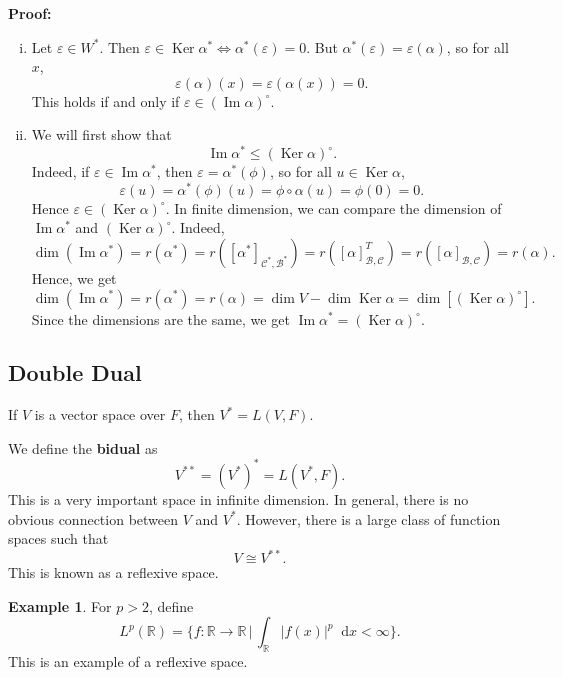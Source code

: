 \documentclass[12pt]{article}
\DeclareMathOperator{\Ker}{Ker}
\DeclareMathOperator{\Img}{Im}
\newcommand{\diff}{\mathop{}\!\mathrm{d}}
\theoremstyle{definition}
\newtheorem{example}{Example}[section]
\theoremstyle{remark}
\begin{document}
\begin{adjustbox}{minipage = \columnwidth - 25.5pt, margin=1em, frame=1pt, margin=0em}
\textbf{Proof:}
\begin{enumerate}[(i)]
	\item Let $\varepsilon \in W^{\ast}$. Then $\varepsilon \in \Ker \alpha^{\ast} \iff \alpha^{\ast} (\varepsilon) = 0$. But $\alpha^{\ast}(\varepsilon) = \varepsilon(\alpha)$, so for all $x$,
			\[
				\varepsilon(\alpha)(x) = \varepsilon(\alpha(x)) = 0
			.\]
			This holds if and only if $\varepsilon \in (\Img \alpha)^{\circ}$.
		\item We will first show that
			 \[
				 \Img \alpha^{\ast} \leq (\Ker \alpha)^{\circ}
			.\]
			Indeed, if $\varepsilon \in \Img \alpha^{\ast}$, then $\varepsilon = \alpha^{\ast}(\phi)$, so for all $u \in \Ker \alpha$,
			\[
				\varepsilon(u) = \alpha^{\ast}(\phi) (u) = \phi \circ \alpha(u) = \phi(0) = 0
			.\]
			Hence $\varepsilon \in (\Ker \alpha)^{\circ}$. In finite dimension, we can compare the dimension of $\Img \alpha^{\ast}$ and $(\Ker \alpha)^{\circ}$. Indeed,
			\[
				\dim (\Img \alpha^{\ast}) = r(\alpha^{\ast}) = r([\alpha^{\ast}]_{\mathcal{C}^{\ast}, \mathcal{B}^{\ast}}) = r([\alpha]_{\mathcal{B},\mathcal{C}}^{T}) = r([\alpha]_{\mathcal{B}, \mathcal{C}}) = r(\alpha)
			.\]
			Hence, we get
			\[
				\dim (\Img \alpha^{\ast}) = r(\alpha^{\ast}) = r(\alpha) = \dim V - \dim \Ker \alpha = \dim [(\Ker \alpha)^{\circ}]
			.\]
			Since the dimensions are the same, we get $\Img \alpha^{\ast} = (\Ker \alpha)^{\circ}$.
\end{enumerate}
\end{adjustbox}

\subsection{Double Dual}%
\label{sub:double_dual}

If $V$ is a vector space over $F$, then $V^{\ast} = L(V, F)$.

We define the \textbf{bidual} as
\[
	V^{\ast \ast} = (V^{\ast})^{\ast} = L(V^{\ast}, F)
.\]
This is a very important space in infinite dimension. In general, there is no obvious connection between $V$ and $V^{\ast}$. However, there is a large class of function spaces such that
\[
V \cong V^{\ast \ast}
.\]
This is known as a reflexive space.

\begin{adjustbox}{minipage = \columnwidth - 25.5pt, margin=1em, frame=1pt, margin=0em}
\begin{example}
	For $p > 2$, define
	\[
		L^{p}(\mathbb{R}) = \biggl\{ f : \mathbb{R} \to \mathbb{R} \,\bigg\vert\, \int_{\mathbb{R}} |f(x)|^{p} \diff x < \infty \biggr\}
	.\]
	This is an example of a reflexive space.
\end{example}
\end{adjustbox}
\end{document}
